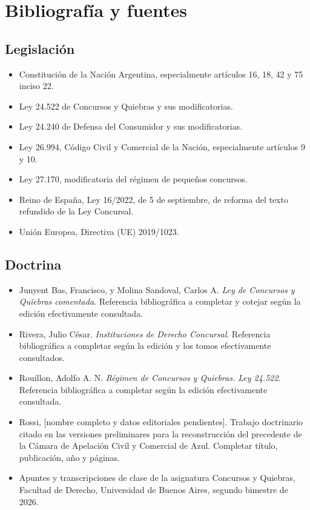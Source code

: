 \documentclass[12pt,oneside]{book}
\begin{document}
\chapter*{Bibliografía y fuentes}

\section*{Legislación}
\begin{itemize}
    \item Constitución de la Nación Argentina, especialmente artículos 16, 18, 42 y 75 inciso 22.
    \item Ley 24.522 de Concursos y Quiebras y sus modificatorias.
    \item Ley 24.240 de Defensa del Consumidor y sus modificatorias.
    \item Ley 26.994, Código Civil y Comercial de la Nación, especialmente artículos 9 y 10.
    \item Ley 27.170, modificatoria del régimen de pequeños concursos.
    \item Reino de España, Ley 16/2022, de 5 de septiembre, de reforma del texto refundido de la Ley Concursal.
    \item Unión Europea, Directiva (UE) 2019/1023.
\end{itemize}

\section*{Doctrina}
\begin{itemize}
    \item Junyent Bas, Francisco, y Molina Sandoval, Carlos A. \textit{Ley de Concursos y Quiebras comentada}. Referencia bibliográfica a completar y cotejar según la edición efectivamente consultada.
    \item Rivera, Julio César. \textit{Instituciones de Derecho Concursal}. Referencia bibliográfica a completar según la edición y los tomos efectivamente consultados.
    \item Rouillon, Adolfo A. N. \textit{Régimen de Concursos y Quiebras. Ley 24.522}. Referencia bibliográfica a completar según la edición efectivamente consultada.
    \item Rossi, [nombre completo y datos editoriales pendientes]. Trabajo doctrinario citado en las versiones preliminares para la reconstrucción del precedente de la Cámara de Apelación Civil y Comercial de Azul. Completar título, publicación, año y páginas.
    \item Apuntes y transcripciones de clase de la asignatura Concursos y Quiebras, Facultad de Derecho, Universidad de Buenos Aires, segundo bimestre de 2026.
\end{itemize}
\end{document}
